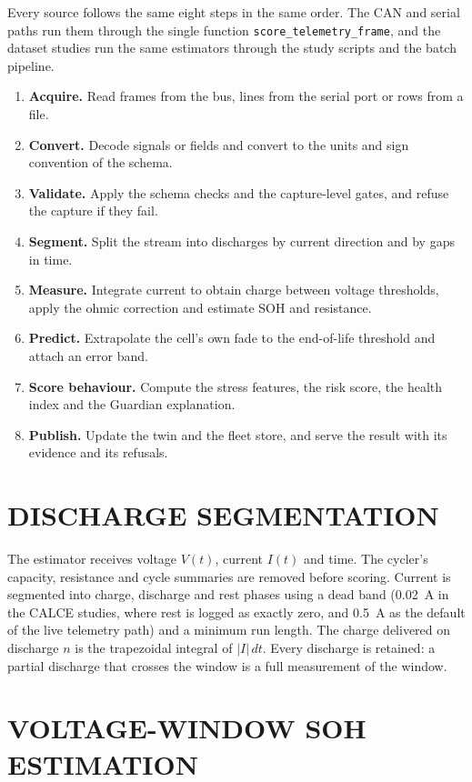 \documentclass[12pt,a4paper]{amritareport}
\begin{document}
Every source follows the same eight steps in the same order. The CAN and serial paths run them through the single function \texttt{score\_telemetry\_frame}, and the dataset studies run the same estimators through the study scripts and the batch pipeline.
\begin{enumerate}
	\item \textbf{Acquire.} Read frames from the bus, lines from the serial port or rows from a file.
	\item \textbf{Convert.} Decode signals or fields and convert to the units and sign convention of the schema.
	\item \textbf{Validate.} Apply the schema checks and the capture-level gates, and refuse the capture if they fail.
	\item \textbf{Segment.} Split the stream into discharges by current direction and by gaps in time.
	\item \textbf{Measure.} Integrate current to obtain charge between voltage thresholds, apply the ohmic correction and estimate SOH and resistance.
	\item \textbf{Predict.} Extrapolate the cell's own fade to the end-of-life threshold and attach an error band.
	\item \textbf{Score behaviour.} Compute the stress features, the risk score, the health index and the Guardian explanation.
	\item \textbf{Publish.} Update the twin and the fleet store, and serve the result with its evidence and its refusals.
\end{enumerate}

\section{DISCHARGE SEGMENTATION}
\label{sec:segment}

The estimator receives voltage $V(t)$, current $I(t)$ and time. The cycler's capacity, resistance and cycle summaries are removed before scoring. Current is segmented into charge, discharge and rest phases using a dead band (0.02~A in the CALCE studies, where rest is logged as exactly zero, and 0.5~A as the default of the live telemetry path) and a minimum run length. The charge delivered on discharge $n$ is the trapezoidal integral of $|I|\,dt$. Every discharge is retained: a partial discharge that crosses the window is a full measurement of the window.

\section{VOLTAGE-WINDOW SOH ESTIMATION}
\label{sec:soh-method}
\end{document}
